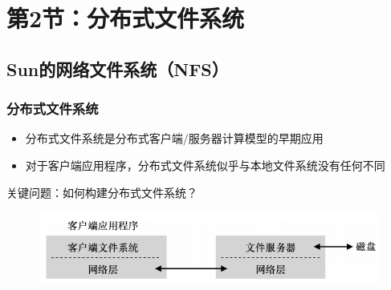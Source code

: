     \section{第2节：分布式文件系统} %
    \subsection{Sun的网络文件系统（NFS）} %
    \begin{frame}[fragile]
        \frametitle{分布式文件系统}
        \begin{itemize}
            \item 分布式文件系统是分布式客户端/服务器计算模型的早期应用
            \item 对于客户端应用程序，分布式文件系统似乎与本地文件系统没有任何不同
        \end{itemize} \pause
        
        \begin{tcolorbox}
        关键问题：{\color{blue}如何构建分布式文件系统？}
        \end{tcolorbox}
        
        
            \begin{figure}
            \includegraphics[width=0.9\linewidth]{figs/distributed-fs.png}
            \end{figure}
\end{frame}
